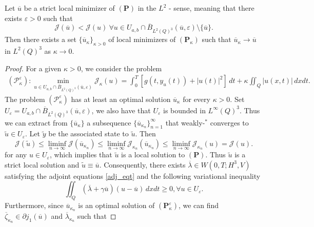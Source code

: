 \documentclass[reqno]{amsart}
\begin{document}
	\begin{theorem}\label{theo6.2}
		Let $\overline{u}$ be a strict local minimizer of $(\textbf{P})$ in the $L^2$ - sense, meaning that there exists $\varepsilon>0$ such that
		\[\mathcal{J}(\overline{u}) < \mathcal{J}(u) \ \forall u \in U_{a,b} \cap \overline{B}_{L^2(Q)^3}(\overline{u}, \varepsilon) \setminus\{ \overline{u} \}.\]
		Then there exists a set $\{\overline{u}_{\kappa}\}_{\kappa>0}$ of local minimizers of $(\textbf{P}_{\kappa})$ such that $\overline{u}_\kappa \to \overline{u}$ in $L^2(Q)^3$ as $\kappa \to 0$.
	\end{theorem}
	\begin{proof}
		For a given $\kappa>0$, we consider the problem
		\begin{align*}
			(\mathcal{P}_{\kappa}^{\varepsilon}): \min_{u \in U_{a,b}\cap\overline{B}_{L^2(Q)^3}(\overline{u}, \varepsilon)}  \mathcal{J}_{\kappa} (u)=  \int_0^T [g(t,y_u(t))+ |u(t)|^2] \,dt + \kappa \iint_Q \vert u(x,t) \vert \, dxdt.
		\end{align*}
		The problem $(\mathcal{P}_{\kappa}^{\varepsilon})$ has at least an optimal solution $\overline{u}_\kappa$ for every $\kappa>0$. 
		Set $U_\varepsilon=U_{a,b}\cap\overline{B}_{L^2(Q)^3}(\overline{u}, \varepsilon)$, we also have that $U_\varepsilon$ is bounded in $L^\infty(Q)^3$. Thus we can extract from $\{\overline{u}_\kappa\}$ a subsequence $\{\overline{u}_{\kappa_n} \} _{n=1}^\infty$ that weakly-$^*$ converges to $\widetilde{u}\in U_\varepsilon$. Let $\widetilde{y}$ be the associated state to $\widetilde{u}$. Then
		\begin{equation*}
			\mathcal{J}(\widetilde{u}) \leq \liminf_{n \to \infty} \mathcal{J}(\overline{u}_{\kappa_n}) \leq \liminf_{n \to \infty} \mathcal{J}_{\kappa_n} (\overline{u}_{\kappa_n}) \leq \liminf_{n \to \infty} \mathcal{J}_{\kappa_n} (u) = \mathcal{J}(u).
		\end{equation*}
		for any $u\in U_\varepsilon$, which implies that $\widetilde{u}$ is a local solution to $(\textbf{P})$. Thus $\widetilde{u}$ is a strict local solution and $\widetilde{u}\equiv\overline{u}$. Consequently, there exists $\overline{\lambda}\in W(0,T;H^3,V)$ satisfying the adjoint equations \eqref{adj_eqt} and the following variational inequality
		\begin{equation} \label{6.2.1}
			\iint_Q (\overline{\lambda}+ \gamma \overline{u})(u-\overline{u}) \, dxdt \geq 0, \forall u\in U_\varepsilon.
		\end{equation}
		Furthermore, since $\overline{u}_{\kappa_n}$ is an optimal solution of $(\textbf{P}_\kappa ^\varepsilon)$, we can find $\overline{\zeta}_{\kappa_n}\in \partial j_1(\overline{u})$ and $\overline{\lambda}_{\kappa_n}$ such that

\end{proof}
\end{document}
